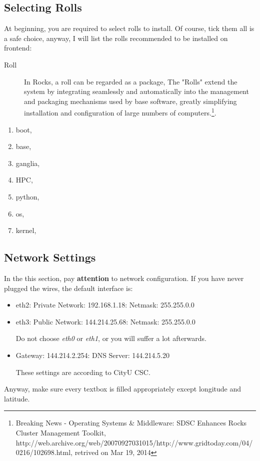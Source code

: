 \subsection{Selecting Rolls}
At beginning, you are required to select rolls to install. Of course, tick them all is a safe choice, anyway, I will list the rolls recommended to be installed on frontend:
\begin{remark}
\begin{description}
\item[Roll] In Rocks, a roll can be regarded as a package, The "Rolls" extend the system by integrating seamlessly and automatically into the management and packaging mechanisms used by base software, greatly simplifying installation and configuration of large numbers of computers.\footnote{Breaking News - Operating Systems \& Middleware: SDSC Enhances Rocks Cluster Management Toolkit, http://web.archive.org/web/20070927031015/http://www.gridtoday.com/04/0216/102698.html, retrived on Mar 19, 2014}.
\end{description}
\end{remark}
\begin{enumerate}
\item boot,
\item base, 
\item ganglia, 
\item HPC,
\item python, 
\item os,
\item kernel,
\end{enumerate}

\subsection{Network Settings}
In the this section, pay {\bf attention} to network configuration. If you have never plugged the wires, the default interface is:
\begin{itemize}
\item eth2: Private Network: 192.168.1.18: Netmask: 255.255.0.0
\item eth3: Public Network: 144.214.25.68: Netmask: 255.255.0.0
\begin{remark}
Do not choose {\it eth0} or {\it eth1}, or you will suffer a lot afterwards.
\end{remark}
\item Gateway: 144.214.2.254: DNS Server: 144.214.5.20
\begin{remark}
These settings are according to CityU CSC.
\end{remark}
\end{itemize}
Anyway, make sure every textbox is filled appropriately except longitude and latitude.

